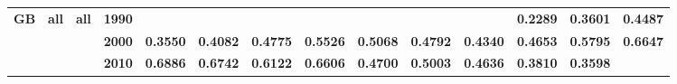 \documentclass[
  authoryear,
  preprint,
  3p]{elsarticle}
\begin{document}
\begin{landscape}
\begin{longtable}[t]{>{}l>{}l>{}l>{}l>{}r>{}r>{}r>{}r>{}r>{}r>{}r>{}r>{}r>{}r}
\addlinespace
\textbf{GB} & \textbf{all} & \textbf{all} & \textbf{1990} & \textcolor[HTML]{4285f4}{\textbf{}} & \textcolor[HTML]{4285f4}{\textbf{}} & \textcolor[HTML]{4285f4}{\textbf{}} & \textcolor[HTML]{4285f4}{\textbf{}} & \textcolor[HTML]{4285f4}{\textbf{}} & \textcolor[HTML]{4285f4}{\textbf{}} & \textcolor[HTML]{4285f4}{\textbf{}} & \textcolor[HTML]{4285f4}{\textbf{0.2289}} & \textcolor[HTML]{4285f4}{\textbf{0.3601}} & \textcolor[HTML]{4285f4}{\textbf{0.4487}}\\
\textbf{} & \textbf{} & \textbf{} & \textbf{2000} & \textcolor[HTML]{4285f4}{\textbf{0.3550}} & \textcolor[HTML]{4285f4}{\textbf{0.4082}} & \textcolor[HTML]{4285f4}{\textbf{0.4775}} & \textcolor[HTML]{4285f4}{\textbf{0.5526}} & \textcolor[HTML]{4285f4}{\textbf{0.5068}} & \textcolor[HTML]{4285f4}{\textbf{0.4792}} & \textcolor[HTML]{4285f4}{\textbf{0.4340}} & \textcolor[HTML]{4285f4}{\textbf{0.4653}} & \textcolor[HTML]{4285f4}{\textbf{0.5795}} & \textcolor[HTML]{4285f4}{\textbf{0.6647}}\\
\textbf{} & \textbf{} & \textbf{} & \textbf{2010} & \textcolor[HTML]{4285f4}{\textbf{0.6886}} & \textcolor[HTML]{4285f4}{\textbf{0.6742}} & \textcolor[HTML]{4285f4}{\textbf{0.6122}} & \textcolor[HTML]{4285f4}{\textbf{0.6606}} & \textcolor[HTML]{4285f4}{\textbf{0.4700}} & \textcolor[HTML]{4285f4}{\textbf{0.5003}} & \textcolor[HTML]{4285f4}{\textbf{0.4636}} & \textcolor[HTML]{4285f4}{\textbf{0.3810}} & \textcolor[HTML]{4285f4}{\textbf{0.3598}} & \textcolor[HTML]{4285f4}{\textbf{}}\\
\bottomrule

\end{longtable}

\endgroup{}
\end{landscape}

\newpage

\begingroup\fontsize{7}{9}\selectfont
\end{document}
